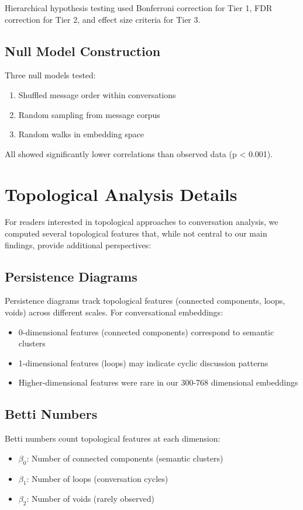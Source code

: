 \documentclass[11pt,letterpaper]{article}
\newcommand{\nullModelPValue}{0.001}
\begin{document}
Hierarchical hypothesis testing used Bonferroni correction for Tier 1, FDR correction for Tier 2, and effect size criteria for Tier 3.

\subsection{Null Model Construction}

Three null models tested:
\begin{enumerate}
\item Shuffled message order within conversations
\item Random sampling from message corpus
\item Random walks in embedding space
\end{enumerate}

All showed significantly lower correlations than observed data (p < \nullModelPValue{}).

\section{Topological Analysis Details}

For readers interested in topological approaches to conversation analysis, we computed several topological features that, while not central to our main findings, provide additional perspectives:

\subsection{Persistence Diagrams}

Persistence diagrams track topological features (connected components, loops, voids) across different scales. For conversational embeddings:
\begin{itemize}
\item 0-dimensional features (connected components) correspond to semantic clusters
\item 1-dimensional features (loops) may indicate cyclic discussion patterns
\item Higher-dimensional features were rare in our 300-768 dimensional embeddings
\end{itemize}

\subsection{Betti Numbers}

Betti numbers count topological features at each dimension:
\begin{itemize}
\item $\beta_0$: Number of connected components (semantic clusters)
\item $\beta_1$: Number of loops (conversation cycles)
\item $\beta_2$: Number of voids (rarely observed)
\end{itemize}
\end{document}

